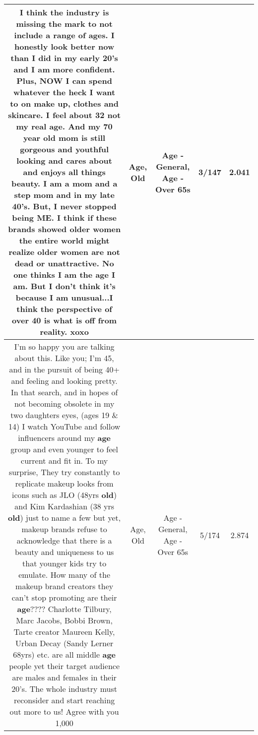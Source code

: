 \documentclass[11pt]{article}
\newlength\mylength
\begin{document}
\begin{center}
\begin{longtable}{|C{.65\mylength}|C{.30\mylength}|C{.12\mylength}|C{.12\mylength}|C{.12\mylength}|}
  \small I think the industry is missing the mark to not include a range of ages.  I honestly look better now than I did in my early 20's and I am more confident.  Plus, NOW I can spend whatever the heck I want to on make up, clothes and skincare.  I feel about 32 not my real \textbf{age}.  And my 70 year \textbf{old} mom is still gorgeous and youthful looking and cares about and enjoys all things beauty.  I am a mom and a step mom and in my late 40's.  But, I never stopped being ME.  I think if these brands showed older women the entire world might realize older women are not dead or unattractive.  No one thinks I am the \textbf{age} I am.  But I don't think it's because I am unusual...I think the perspective of over 40 is what is off from reality.  xoxo\normalsize   & Age, Old & Age - General, Age - Over 65s & 3/147 & 2.041 \\  \hline
  \small I'm so happy you are talking about this.  Like you; I'm 45, and in the pursuit of being 40+ and feeling and looking pretty. In that search, and in hopes of not becoming obsolete in my two daughters eyes, (ages 19 \& 14) I watch YouTube and follow influencers around my \textbf{age} group and even younger to feel current and fit in.  To my surprise, They try constantly to replicate makeup looks from icons such as JLO (48yrs \textbf{old}) and Kim Kardashian (38 yrs \textbf{old}) just to name a few but yet, makeup brands refuse to acknowledge that there is a beauty and uniqueness to us that younger kids try to emulate.  How many of the makeup brand creators they can't stop promoting are their \textbf{age}???? Charlotte Tilbury, Marc Jacobs, Bobbi Brown, Tarte creator Maureen Kelly, Urban Decay (Sandy Lerner 68yrs) etc. are all middle \textbf{age} people yet their target audience are males and females in their 20's.  The whole industry must reconsider and start reaching out more to us! Agree with you 1,000\normalsize   & Age, Old & Age - General, Age - Over 65s & 5/174 & 2.874 \\  \hline

\end{longtable}
\end{center}
\end{document}
